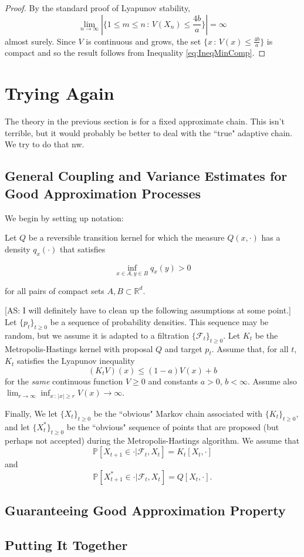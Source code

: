 \begin{proof}
By the standard proof of Lyapunov stability,
\[
\lim_{n \rightarrow \infty} |\{1 \leq m \leq n \, : \, V(X_{n}) \leq \frac{4b}{a} \}| = \infty
\]
almost surely. Since $V$ is continuous and grows, the set $\{x \, :\, V(x) \leq \frac{4b}{a} \}$ is compact and so the result follows from Inequality \eqref{eq:IneqMinComp}.

\end{proof}

\section{Trying Again}

The theory in the previous section is for a fixed approximate chain. This isn't terrible, but it would probably be better to deal with the ``true" adaptive chain. We try to do that nw.

\subsection*{General Coupling and Variance Estimates for Good Approximation Processes}

We begin by setting up notation:

\begin{assumption}
Let $Q$ be a reversible transition kernel for which the measure $Q(x,\cdot)$ has a density $q_{x}(\cdot)$ that satisfies

\begin{equation}
\inf_{x \in A, y \in B} q_{x}(y) > 0
\label{eq:IneqMinComp}
\end{equation}

\noindent for all pairs of compact sets $A,B \subset \mathbb{R}^{d}$.

[AS: I will definitely have to clean up the following assumptions at some point.]
Let $\{p_{t}\}_{t \geq 0}$ be a sequence of probability densities. This sequence may be random, but we assume it is adapted to a filtration $\{ \mathcal{F}_{t} \}_{t \geq 0}$. Let $K_{t}$ be the Metropolis-Hastings kernel with proposal $Q$ and target $p_{t}$. Assume that, for all $t$, $K_{t}$ satisfies the Lyapunov inequality $$(K_{t}V)(x) \leq (1-a) V(x) + b$$
for the \textit{same} continuous function $V \geq 0$ and constants $a> 0$, $b <\infty$. Assume also $\lim_{r \rightarrow \infty} \inf_{x \, : \, |x| \geq r}V(x) \rightarrow \infty$.

Finally, We let $\{X_{t}\}_{t \geq 0}$ be the ``obvious" Markov chain associated with $\{K_{t}\}_{t \geq 0}$, and let $\{X_{t}^{\ast} \}_{t \geq 0}$ be the ``obvious" sequence of points that are proposed (but perhaps not accepted) during the Metropolis-Hastings algorithm. We assume that $$\mathbb{P}[X_{t+1} \in \cdot | \mathcal{F}_{t}, X_{t}] = K_{t}[X_{t},\cdot]$$
and $$\mathbb{P}[X_{t+1}^{\ast} \in \cdot | \mathcal{F}_{t}, X_{t}] = Q[X_{t},\cdot].$$

\end{assumption}


\subsection*{Guaranteeing Good Approximation Property}

\subsection*{Putting It Together}
